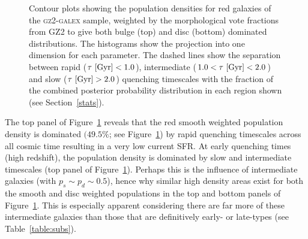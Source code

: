 \begin{figure}
\caption[Population densities of red smooth and disc galaxies]{Contour plots showing the population densities for red galaxies of the \textsc{gz2-galex} sample, weighted by the morphological vote fractions from GZ2 to give both bulge (top) and disc (bottom) dominated distributions. The histograms show the projection into one dimension for each parameter. The dashed lines show the separation between rapid ($\tau ~\rm{[Gyr]} < 1.0$), intermediate ($1.0 < \tau ~\rm{[Gyr]} < 2.0$) and slow ($\tau ~\rm{[Gyr]} > 2.0$) quenching timescales with the fraction of the combined posterior probability distribution in each region shown (see Section~\ref{stats}).}
\label{red_s}
\end{figure}

The top panel of Figure~\ref{red_s} reveals that the red smooth weighted population density is dominated $(49.5\%$; see Figure~\ref{red_s}) by rapid quenching timescales across all cosmic time resulting in a very low current SFR. At early quenching times (high redshift), the population density is dominated by slow and intermediate timescales (top panel of Figure~\ref{red_s}). Perhaps this is the influence of intermediate galaxies (with $p_s \sim p_d \sim 0.5$), hence why similar high density areas exist for both the smooth and disc weighted populations in the top and bottom panels of Figure~\ref{red_s}. This is especially apparent considering there are far more of these intermediate galaxies than those that are definitively early- or late-types (see Table~\ref{table:subs}). 

